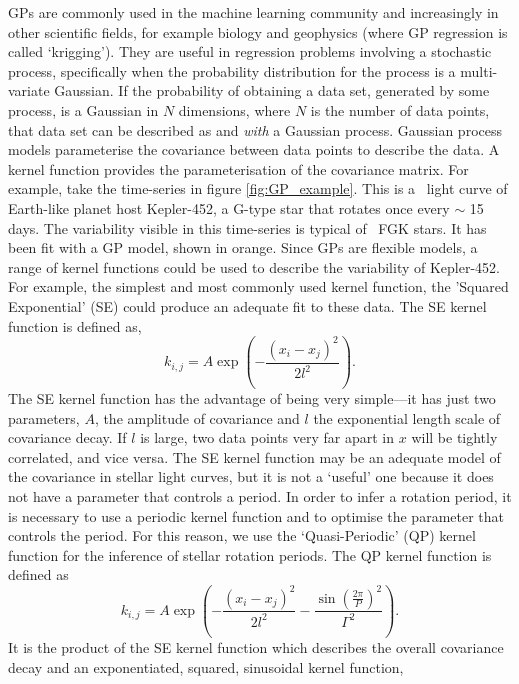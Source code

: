 GPs are commonly used in the machine learning community and increasingly
in other scientific fields, for example biology and geophysics (where GP
regression is called `krigging').
They are useful in regression problems involving a stochastic process,
specifically when the probability distribution for the process is a
multi-variate Gaussian.
If the probability of obtaining a data set, generated by some process, is a
Gaussian in $N$ dimensions, where $N$ is the number of data points, that data
set can be described as and {\it with} a Gaussian process.
Gaussian process models parameterise the covariance between data points to
describe the data.
A kernel function provides the parameterisation of the covariance matrix.
For example, take the time-series in figure \ref{fig:GP_example}.
This is a \kepler\ light curve of Earth-like planet host Kepler-452, a G-type
star that rotates once every $\sim$ 15 days.
The variability visible in this time-series is typical of \kepler\ FGK stars.
It has been fit with a GP model, shown in orange.
Since GPs are flexible models, a range of kernel functions could be used to
describe the variability of Kepler-452.
For example, the simplest and most commonly used kernel function, the
'Squared Exponential' (SE) could produce an adequate fit to these data.
The SE kernel function is defined as,
\begin{equation}
k_{i,j} = A \exp \left(-\frac{(x_i - x_j)^2}{2l^2} \right).
\end{equation}
\label{eq:SE}
The SE kernel function has the advantage of being very simple---it has just
two parameters, $A$, the amplitude of covariance and $l$ the exponential
length scale of covariance decay.
If $l$ is large, two data points very far apart in $x$ will be tightly
correlated, and vice versa.
The SE kernel function may be an adequate model of the covariance in stellar
light curves, but it is not a `useful' one because it does not have a
parameter that controls a period.
In order to infer a rotation period, it is necessary to use a periodic kernel
function and to optimise the parameter that controls the period.
For this reason, we use the `Quasi-Periodic' (QP) kernel function for the
inference of stellar rotation periods.
The QP kernel function is defined as
\begin{equation}
k_{i,j} = A \exp \left(-\frac{(x_i - x_j)^2}{2l^2} -
\frac{\sin(\frac{2\pi}{P})^2}{\Gamma^2} \right).
\end{equation}
\label{eq:QP}
It is the product of the SE kernel function which describes the overall
covariance decay and an exponentiated, squared, sinusoidal kernel function,
